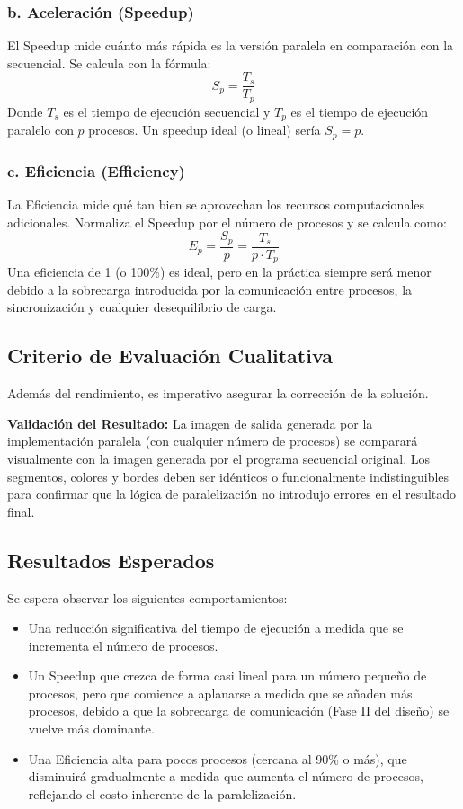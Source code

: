 \documentclass[fleqn,10pt]{article}
\begin{document}
\subsubsection*{b. Aceleración (Speedup)}
El Speedup mide cuánto más rápida es la versión paralela en comparación con la secuencial. Se calcula con la fórmula:
\[
S_p = \frac{T_s}{T_p}
\]
Donde $T_s$ es el tiempo de ejecución secuencial y $T_p$ es el tiempo de ejecución paralelo con $p$ procesos. Un speedup ideal (o lineal) sería $S_p = p$.

\subsubsection*{c. Eficiencia (Efficiency)}
La Eficiencia mide qué tan bien se aprovechan los recursos computacionales adicionales. Normaliza el Speedup por el número de procesos y se calcula como:
\[
E_p = \frac{S_p}{p} = \frac{T_s}{p \cdot T_p}
\]
Una eficiencia de 1 (o 100\%) es ideal, pero en la práctica siempre será menor debido a la sobrecarga introducida por la comunicación entre procesos, la sincronización y cualquier desequilibrio de carga.

\subsection{Criterio de Evaluación Cualitativa}
Además del rendimiento, es imperativo asegurar la corrección de la solución.

\textbf{Validación del Resultado:} La imagen de salida generada por la implementación paralela (con cualquier número de procesos) se comparará visualmente con la imagen generada por el programa secuencial original. Los segmentos, colores y bordes deben ser idénticos o funcionalmente indistinguibles para confirmar que la lógica de paralelización no introdujo errores en el resultado final.

\subsection{Resultados Esperados}
Se espera observar los siguientes comportamientos:
\begin{itemize}
    \item Una reducción significativa del tiempo de ejecución a medida que se incrementa el número de procesos.
    \item Un Speedup que crezca de forma casi lineal para un número pequeño de procesos, pero que comience a aplanarse a medida que se añaden más procesos, debido a que la sobrecarga de comunicación (Fase II del diseño) se vuelve más dominante.
    \item Una Eficiencia alta para pocos procesos (cercana al 90\% o más), que disminuirá gradualmente a medida que aumenta el número de procesos, reflejando el costo inherente de la paralelización.
\end{itemize}
\end{document}
